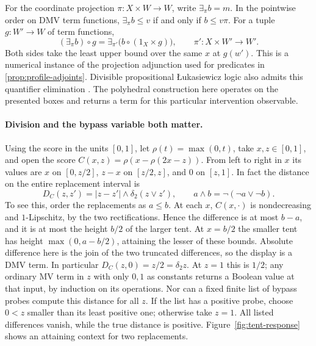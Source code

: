 \documentclass[11pt,a4paper]{article}
\theoremstyle{definition}
\theoremstyle{remark}\newaliascnt{remark}{theorem}
\numberwithin{equation}{section}
\begin{document}
For the coordinate projection \(\pi:X\times W\to W\), write \(\exists_\pi b=m\). In the pointwise order on DMV term functions, \(\exists_\pi b\le v\) if and only if \(b\le v\pi\). For a tuple \(g:W'\to W\) of term functions,
\[
 (\exists_\pi b)\circ g=\exists_{\pi'}\bigl(b\circ(1_X\times g)\bigr),
 \qquad \pi':X\times W'\to W'.
\]
Both sides take the least upper bound over the same \(x\) at \(g(w')\). This is a numerical instance of the projection adjunction used for predicates in \cref{prop:profile-adjoints}. Divisible propositional \L{}ukasiewicz logic also admits this quantifier elimination \cite{pkhakadze-qe}. The polyhedral construction here operates on the presented boxes and returns a term for this particular intervention observable.

\paragraph{Division and the bypass variable both matter.}
Using the score in the units \([0,1]\), let \(\rho(t)=\max(0,t)\), take \(x,z\in[0,1]\), and open the score \(C(x,z)=\rho(x-\rho(2x-z))\). From left to right in \(x\) its values are \(x\) on \([0,z/2]\), \(z-x\) on \([z/2,z]\), and \(0\) on \([z,1]\). In fact the distance on the entire replacement interval is
\[
 D_C(z,z')=|z-z'|\wedge\delta_2(z\vee z'),
 \qquad a\wedge b=\neg(\neg a\vee\neg b).
\]
To see this, order the replacements as \(a\le b\). At each \(x\), \(C(x,\cdot)\) is nondecreasing and \(1\)-Lipschitz, by the two rectifications. Hence the difference is at most \(b-a\), and it is at most the height \(b/2\) of the larger tent. At \(x=b/2\) the smaller tent has height \(\max(0,a-b/2)\), attaining the lesser of these bounds. Absolute difference here is the join of the two truncated differences, so the display is a DMV term. In particular \(D_C(z,0)=z/2=\delta_2 z\). At \(z=1\) this is \(1/2\); any ordinary MV term in \(z\) with only \(0,1\) as constants returns a Boolean value at that input, by induction on its operations. Nor can a fixed finite list of bypass probes compute this distance for all \(z\). If the list has a positive probe, choose \(0<z\) smaller than its least positive one; otherwise take \(z=1\). All listed differences vanish, while the true distance is positive. Figure~\ref{fig:tent-response} shows an attaining context for two replacements.
\end{document}
